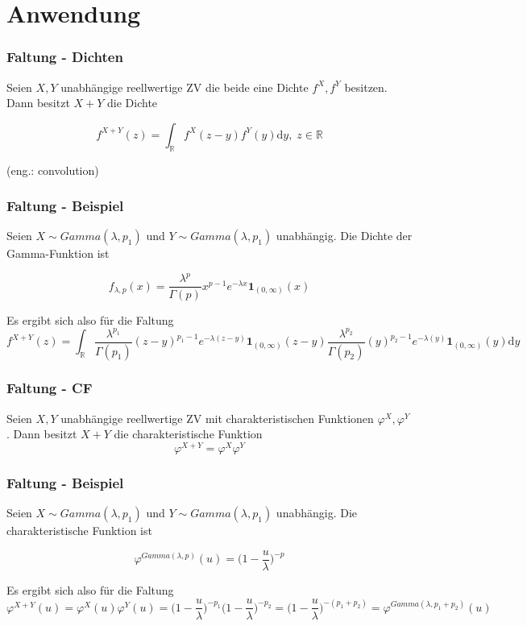 \documentclass{beamer}
\newcommand{\R}{\mathbb{R}}
\newcommand\dint{\mathord{\mathrm{d}}}
\begin{document}
\section{Anwendung}

\begin{frame}
\frametitle{Faltung - Dichten}
  Seien $X, Y$ unabhängige reellwertige ZV die beide eine Dichte $f^X, f^Y$ besitzen. Dann besitzt $X+Y$ die Dichte

\begin{equation*}
  f^{X+Y}(z) = \int_{\R} f^X(z - y)f^Y(y) \dint y, \; z \in \R
\end{equation*}

(eng.: convolution)
\end{frame}

\begin{frame}
\frametitle{Faltung - Beispiel}
Seien $X \sim Gamma(\lambda, p_1)$ und $Y \sim Gamma(\lambda, p_1)$ unabhängig. Die Dichte der Gamma-Funktion ist

$$f_{\lambda, p}(x) = \frac{\lambda^p}{\Gamma(p)} x^{p-1} e^{-\lambda x} \mathbf{1}_{(0, \infty)} (x)$$

Es ergibt sich also für die Faltung
{\scriptsize
$$f^{X+Y}(z) = \int_\R \frac{\lambda^{p_1}}{\Gamma(p_1)} (z-y)^{p_1-1} e^{-\lambda (z-y)} \mathbf{1}_{(0, \infty)} (z-y) \frac{\lambda^{p_2}}{\Gamma(p_2)} (y)^{p_2-1} e^{-\lambda (y)} \mathbf{1}_{(0, \infty)} (y) \dint y$$
}%
\end{frame}

\begin{frame}
\frametitle{Faltung - CF}
  Seien $X, Y$ unabhängige reellwertige ZV mit charakteristischen Funktionen $\varphi^X, \varphi^Y$. Dann besitzt $X + Y$ die charakteristische Funktion
$$\varphi^{X+Y} = \varphi^X \varphi^Y$$
\end{frame}

\begin{frame}
\frametitle{Faltung - Beispiel}
Seien $X \sim Gamma(\lambda, p_1)$ und $Y \sim Gamma(\lambda, p_1)$ unabhängig. Die charakteristische Funktion ist

$$\varphi^{Gamma(\lambda, p)}(u) = \Bigg(1-\frac{u}{\lambda}\Bigg)^{-p}$$

Es ergibt sich also für die Faltung
{\tiny
$$\varphi^{X+Y}(u) = \varphi^{X}(u)\varphi^{Y}(u) = \Bigg(1-\frac{u}{\lambda}\Bigg)^{-p_1} \Bigg(1-\frac{u}{\lambda}\Bigg)^{-p_2} = \Bigg(1-\frac{u}{\lambda}\Bigg)^{-(p_1+p_2)} = \varphi^{Gamma(\lambda, p_1 + p_2)}(u)$$
}%
\end{frame}
\end{document}
